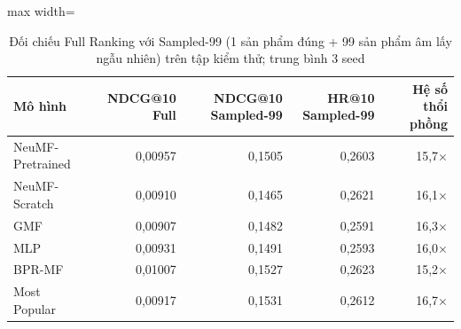 \begin{table}[htbp]
    \centering\small
    \caption{Đối chiếu Full Ranking với Sampled-99 (1 sản phẩm đúng + 99 sản phẩm âm lấy ngẫu nhiên) trên tập kiểm thử; trung bình 3 seed}
    \label{tab:sampled}
    \begin{adjustbox}{max width=\textwidth}
    \begin{tabular}{lrrrr}
        \toprule
        Mô hình & NDCG@10 Full & NDCG@10 Sampled-99 & HR@10 Sampled-99 & Hệ số thổi phồng \\
        \midrule
        NeuMF-Pretrained & 0{,}00957 & 0{,}1505 & 0{,}2603 & 15{,}7$\times$ \\
        NeuMF-Scratch & 0{,}00910 & 0{,}1465 & 0{,}2621 & 16{,}1$\times$ \\
        GMF & 0{,}00907 & 0{,}1482 & 0{,}2591 & 16{,}3$\times$ \\
        MLP & 0{,}00931 & 0{,}1491 & 0{,}2593 & 16{,}0$\times$ \\
        BPR-MF & 0{,}01007 & 0{,}1527 & 0{,}2623 & 15{,}2$\times$ \\
        Most Popular & 0{,}00917 & 0{,}1531 & 0{,}2612 & 16{,}7$\times$ \\
        \bottomrule
    \end{tabular}
    \end{adjustbox}
    \par{}
\end{table}
